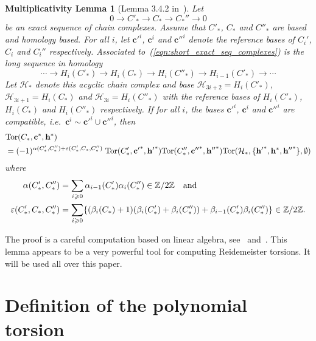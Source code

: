 \documentclass[a4paper]{amsart}
\theoremstyle{plain}
\newtheorem*{MultLemma}{Multiplicativity Lemma}
\theoremstyle{definition}
\theoremstyle{remark}
\newcommand{\ie}{\emph{i.e.}}
\newcommand{\mygeq}{\geqslant}
\newcommand{\ZZ}{{\mathbb Z}}
\newcommand{\Tor}[3]{\mathrm{Tor} ({#1}, {#2}, {#3})}
\newcommand{\cbasis}[2][c]{\mathbf{#1}^{#2}}
\newcommand{\hbasis}[2][h]{\mathbf{#1}^{#2}}
\begin{document}
\begin{MultLemma}[Lemma 3.4.2 in~\cite{Turaev86:torsion_in_knot_theory}]
  \label{lemma:Multiplicativite}
  Let
  \begin{equation}\label{eqn:short_exact_seq_complexes}
      0 \to C'_* \to C_* \to C_*'' \to 0
  \end{equation}
  be an exact sequence of chain complexes. Assume that $C'_*$, $C_*$
  and $C''_*$ are based and homology based. For all $i$, let
  $\cbasis[c']{i}$, $\cbasis[c]{i}$ and $\cbasis[c'']{i}$ denote the
  reference bases of $C_i'$, $C_i$ and $C_i''$ respectively.
  Associated to~(\ref{eqn:short_exact_seq_complexes}) is the long
  sequence in homology
  \[
    \cdots \to 
    H_i(C'_*) \to 
    H_i(C_*)  \to 
    H_i(C''_*) \to 
    H_{i-1}(C'_*) \to 
    \cdots 
  \]
  Let $\mathcal{H}_*$ denote this acyclic chain complex and base
  $\mathcal{H}_{3i+2} = H_i(C'_*)$, $\mathcal{H}_{3i+1} = H_i(C_*)$
  and $\mathcal{H}_{3i} = H_i(C''_*)$ with the reference bases of
  $H_i(C'_*)$, $H_i(C_*)$ and $H_i(C''_*)$ respectively.  If for all
  $i$, the bases $\cbasis[c']{i}$, $\cbasis{i}$ and $\cbasis[c'']{i}$
  are compatible, 
  \ie~$\cbasis{i} \sim \cbasis[c']{i} \cup \cbasis[c'']{i}$, then
  \begin{align*}
    \lefteqn{\Tor{C_*}{\cbasis{*}}{\hbasis{*}}} &\\
    &= (-1)^{\alpha(C'_*, C''_*) + \varepsilon(C'_*, C_*, C''_*)} \;
    \Tor{C'_*}{\cbasis[c']{*}}{\hbasis[h']{*}}
    \Tor{C''_*}{\cbasis[c'']{*}}{\hbasis[h'']{*}}
    \Tor{\mathcal{H}_*}{\{\hbasis[h']{*}, \hbasis{*},\hbasis[h'']{*}\}}{\emptyset}
  \end{align*}
  where 
  \begin{align*}
    \alpha(C'_*, C''_*) &= 
    \sum_{i \mygeq 0} \alpha_{i-1}(C'_*) \alpha_i(C''_*) \in \ZZ/2\ZZ 
  \quad \hbox{and}\\
    \varepsilon(C'_*, C_*, C''_*) &= 
    \sum_{i \mygeq 0}
    \{(\beta_i(C_*)+1)(\beta_i(C_*') + \beta_i(C_*'')) + 
      \beta_{i-1}(C_*')\beta_i(C_*'')\}
    \in \ZZ/2\ZZ.
  \end{align*}
\end{MultLemma}
The proof is a careful computation based on linear algebra,
see~\cite[Lemma 3.4.2]{Turaev86:torsion_in_knot_theory}
and~\cite[Theorem 3.2]{Milnor:1966}.  This lemma appears to be a very
powerful tool for computing Reidemeister torsions. It will be used all
over this paper.


\section{Definition of the polynomial torsion}
\label{section:def_polynomial_torsion}
\end{document}
